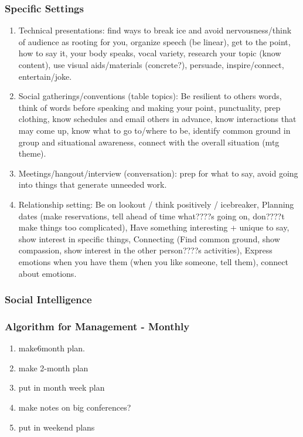 \begin{frame}[label=specsettings] 
\frametitle{Specific Settings}
\begin{enumerate} 
\tiny \item \tiny Technical presentations: find ways to break ice and avoid
  nervousness/think of audience as rooting for you, organize speech
  (be linear), get to the point, how to say it, your body speaks,
  vocal variety, research your topic (know content), use visual  aids/materials (concrete?), persuade, inspire/connect, entertain/joke.
 \item \tiny Social gatherings/conventions (table topics): Be resilient to
  others words, think of words before speaking and making your point,
  punctuality, prep clothing, know schedules and email others in
  advance, know interactions that may come up, know what to go
  to/where to be, identify common ground in group and situational
  awareness, connect with the overall situation (mtg theme). 
  \item \tiny Meetings/hangout/interview (conversation): prep for what to say,
  avoid going into things that generate unneeded work. 
  \item \tiny Relationship setting: Be on lookout / think positively /
  icebreaker, Planning dates (make reservations, tell ahead of time
  what????s going on, don????t make things too complicated), Have something
  interesting + unique to say, show interest in specific things,
  Connecting (Find common ground, show compassion, show interest in
  the other person????s activities), Express emotions when you have them
  (when you like someone, tell them), connect about emotions. 
\end{enumerate} 
\end{frame} 

\begin{frame}
\frametitle{Social Intelligence} 
\end{frame}  

\begin{frame} 
\frametitle{Algorithm for Management - Monthly} 
\begin{enumerate} 
\tiny \item\tiny make6month plan.
\tiny \item \tiny make 2-month plan 
\item \tiny put in month week plan 
\item \tiny make notes on big conferences? 
\item \tiny put in weekend plans
\end{enumerate} 
\end{frame} 

